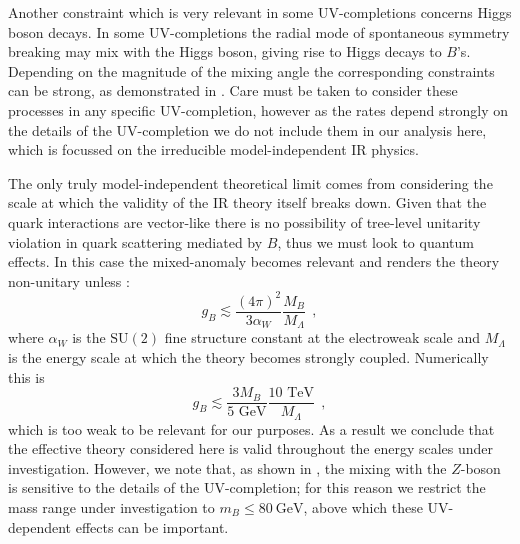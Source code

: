 \documentclass[withindex,glossary]{cam-thesis}
\begin{document}
Another constraint which is very relevant in some UV-completions concerns Higgs boson decays.  In some UV-completions the radial mode of spontaneous symmetry breaking may mix with the Higgs boson, giving rise to Higgs decays to $B$'s.  Depending on the magnitude of the mixing angle the corresponding constraints can be strong, as demonstrated in \cite{Perez:2020izb}.  Care must be taken to consider these processes in any specific UV-completion, however as the rates depend strongly on the details of the UV-completion we do not include them in our analysis here, which is focussed on the irreducible model-independent IR physics.

The only truly model-independent theoretical limit comes from considering the scale at which the validity of the IR theory itself breaks down.  Given that the quark interactions are vector-like there is no possibility of tree-level unitarity violation in quark scattering mediated by $B$, thus we must look to quantum effects.  In this case the mixed-anomaly becomes relevant and renders the theory non-unitary unless \cite{Preskill:1990fr}:
\begin{equation}
g_B \lesssim \frac{(4 \pi)^2}{3 \alpha_W} \frac{M_B}{M_\Lambda} ~~,
\end{equation}
where $\alpha_W$ is the $\text{SU}(2)$ fine structure constant at the electroweak scale and $M_\Lambda $ is the energy scale at which the theory becomes strongly coupled.  Numerically this is
\begin{equation}
g_B \lesssim \frac{3M_B}{5 \text{ GeV}} \frac{10 \text{ TeV}}{M_\Lambda} ~~,
\end{equation}
which is too weak to be relevant for our purposes.  As a result we conclude that the effective theory considered here is valid throughout the energy scales under investigation. However, we note that, as shown in
\cite{Dobrescu:2021vak}, the mixing with the $Z$-boson is sensitive to
the details of the UV-completion; for this reason we restrict the mass range under
investigation to $m_B \leq 80\ \text{GeV}$, above which these UV-dependent effects can be important.  %
\end{document}
